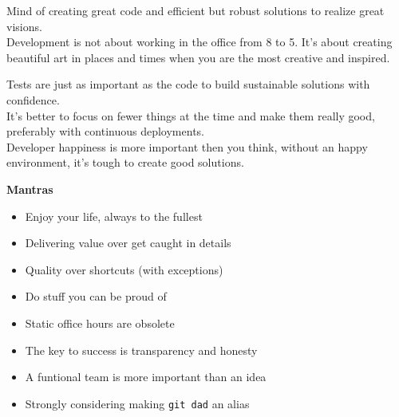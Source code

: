 \documentclass[9pt]{template} %
\begin{document}
\begin{minipage}[t]{0.4\textwidth} %
  \vspace{-\baselineskip}

  Mind of creating great code and efficient but robust solutions to realize great visions.\\

  Development is not about working in the office from 8 to 5. It's about creating beautiful art in places and times when you are the most creative and inspired.

  Tests are just as important as the code to build sustainable solutions with confidence.\\

  It's better to focus on fewer things at the time and make them really good, preferably with continuous deployments.\\

  Developer happiness is more important then you think, without an happy environment, it's tough to create good solutions.
\end{minipage}
\hfill
\begin{minipage}[t]{0.5\textwidth}
  \vspace{-\baselineskip}
  \textbf{Mantras}
  \begin{itemize}
      \item Enjoy your life, always to the fullest
      \item Delivering value over get caught in details
      \item Quality over shortcuts (with exceptions)
      \item Do stuff you can be proud of
      \item Static office hours are obsolete
      \item The key to success is transparency and honesty
      \item A funtional team is more important than an idea
      \item Strongly considering making \texttt{git dad} an alias
  \end{itemize}
\end{minipage}


\pagebreak
{}
\end{document}

